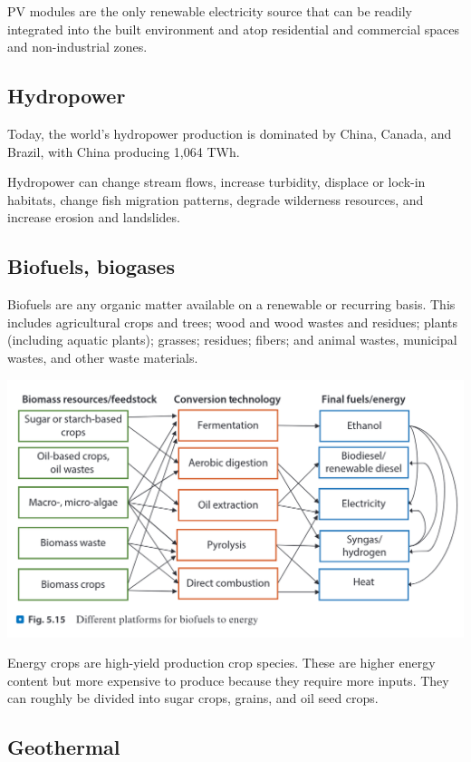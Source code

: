 PV modules are the only renewable electricity source that can be readily
integrated into the built environment and atop residential and commercial
spaces and non-industrial zones.

\subsection{Hydropower}

Today, the world’s hydropower production is dominated by China, Canada, and
Brazil, with China producing 1,064 TWh.

Hydropower can change stream flows, increase turbidity, displace or lock-in
habitats, change fish migration patterns, degrade wilderness resources, and
increase erosion and landslides.

\subsection{Biofuels, biogases}

Biofuels are any organic matter available on a renewable or recurring basis.
This includes agricultural crops and trees; wood and wood wastes and residues;
plants (including aquatic plants); grasses; residues; fibers; and animal
wastes, municipal wastes, and other waste materials.

\includegraphics[width=0.75\linewidth]{content/img/biomass.png}

Energy crops are high-yield production crop species.
These are higher energy content but more expensive to produce because they
require more inputs. They can roughly be divided into sugar crops, grains, and
oil seed crops.

\subsection{Geothermal}

